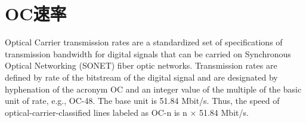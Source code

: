\section{OC速率}
Optical Carrier transmission rates are a standardized set of specifications of transmission bandwidth for digital signals that can be carried on Synchronous Optical Networking (SONET) fiber optic networks. Transmission rates are defined by rate of the bitstream of the digital signal and are designated by hyphenation of the acronym OC and an integer value of the multiple of the basic unit of rate, e.g., OC-48. The base unit is 51.84 Mbit/s. Thus, the speed of optical-carrier-classified lines labeled as OC-n is n × 51.84 Mbit/s.
